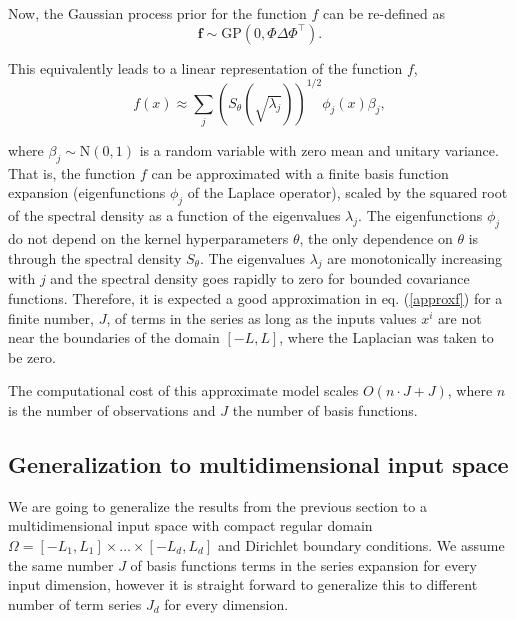 \documentclass[]{interact}
\theoremstyle{plain}%
\theoremstyle{definition}
\theoremstyle{remark}
\begin{document}
\noindent Now, the Gaussian process prior for the function $f$ can be re-defined as
%
\begin{equation}
\mathbf{f} \sim \text{GP}(0,\Phi \Delta \Phi^\intercal). \nonumber
\end{equation}

\noindent This equivalently leads to a linear representation of the function $f$,
%
\begin{equation}\label{approxf}
f(x) \approx \sum_{j} \left( S_{\theta}(\sqrt{\lambda_j})\right)^{1/2} \phi_j(x) \beta_j, \nonumber
\end{equation}

\noindent where $\beta_j \sim \text{N}(0,1)$ is a random variable with zero mean and unitary variance. That is, the function $f$ can be approximated with a finite basis function expansion (eigenfunctions $\phi_j$ of the Laplace operator), scaled by the squared root of the spectral density as a function of the eigenvalues $\lambda_j$. The eigenfunctions $\phi_j$ do not depend on the kernel hyperparameters $\theta$, the only dependence on $\theta$ is through the spectral density $S_{\theta}$. The eigenvalues $\lambda_j$ are monotonically increasing with $j$ and the spectral density goes rapidly to zero for bounded covariance functions. Therefore, it is expected a good approximation in eq. (\ref{approxf}) for a finite number, $J$, of terms in the series as long as the inputs values $x^i$ are not near the boundaries of the domain $[-L,L]$, where the Laplacian was taken to be zero.

The computational cost of this approximate model scales $O(n\cdot J+J)$, where $n$ is the number of observations and $J$ the number of basis functions.



\subsection{Generalization to multidimensional input space}

We are going to generalize the results from the previous section to a multidimensional input space with compact regular domain $\Omega=[-L_1,L_1] \times \dots \times [-L_d,L_d]$ and Dirichlet boundary conditions. We assume the same number $J$ of basis functions terms in the series expansion for every input dimension, however it is straight forward to generalize this to different number of term series $J_d$ for every dimension. 
\end{document}
